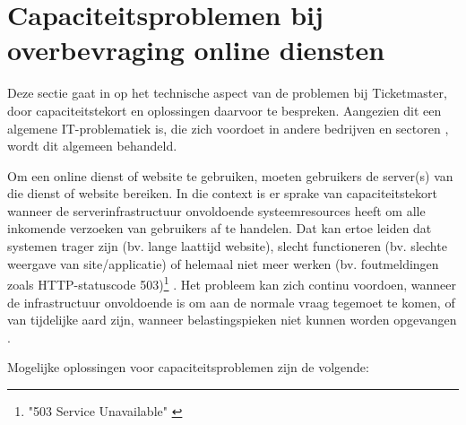 
\section{Capaciteitsproblemen bij overbevraging online diensten}

Deze sectie gaat in op het technische aspect van de problemen bij Ticketmaster,
door capaciteitstekort en oplossingen daarvoor te bespreken. Aangezien dit
een algemene IT-problematiek is, die zich voordoet in andere bedrijven en
sectoren \cite{warren2023chatgpt, warren2020discord, reuters2023what},
wordt dit algemeen behandeld. 

Om een online dienst of website te gebruiken, moeten gebruikers de
server(s) van die dienst of website bereiken. In die context is er sprake van
capaciteitstekort wanneer de serverinfrastructuur onvoldoende systeemresources
heeft om alle inkomende verzoeken van gebruikers af te handelen.
Dat kan ertoe leiden dat systemen trager zijn (bv. lange laattijd website),
slecht functioneren (bv. slechte weergave van site/applicatie) of
helemaal niet meer werken (bv. foutmeldingen zoals HTTP-statuscode
503)\footnote{"503 Service Unavailable" \cite{fielding2022http}}
\cite{guitart2010survey, guitart2007designing}.
Het probleem kan zich continu voordoen, wanneer de infrastructuur onvoldoende
is om aan de normale vraag tegemoet te komen,
of van tijdelijke aard zijn, wanneer belastingspieken niet kunnen worden
opgevangen \cite{schroeder2006web}.

Mogelijke oplossingen voor capaciteitsproblemen zijn de volgende:

